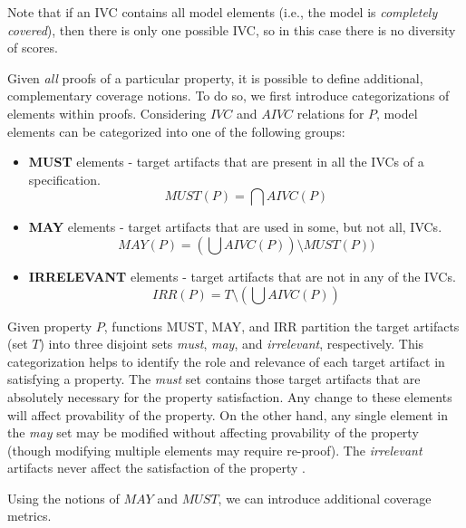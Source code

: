 \noindent Note that if an IVC contains all model elements (i.e., the model is {\em completely covered}), then there is only one possible IVC, so in this case there is no diversity of scores.


Given {\em all} proofs of a particular property, it is possible to define additional, complementary coverage notions.  To do so, we first introduce categorizations of elements within proofs.
%
Considering $IVC$ and $AIVC$ relations for $P$, model elements can be categorized into one of the following groups:

\begin{itemize}
  \item \textbf{MUST} elements - target artifacts that are present in all the IVCs of a specification.
      \[
      MUST (P) = \bigcap AIVC(P)
      \]

  \item \textbf{MAY} elements - target artifacts that are used in some, but not all, IVCs.
      \[
      MAY(P) = (\bigcup AIVC (P)) \setminus MUST (P))
      \]

  \item \textbf{IRRELEVANT} elements - target artifacts that are not in any of the IVCs.
  $$IRR(P) = T \setminus (\bigcup AIVC (P))$$
\end{itemize}

Given property $P$, functions MUST, MAY, and IRR partition the target artifacts (set $T$) into three disjoint sets \emph{must}, \emph{may}, and \emph{irrelevant}, respectively. This categorization helps to identify the role and relevance of each target artifact in satisfying a property. The \emph{must} set contains those target artifacts that are absolutely necessary for the property satisfaction.  Any change to these elements will affect provability of the property. On the other hand, any single element in the \emph{may} set may be modified without affecting provability of the property (though modifying multiple elements may require re-proof).   The \emph{irrelevant} artifacts never affect the satisfaction of the property \cite{Murugesan16:renext}.


Using the notions of $MAY$ and $MUST$, we can introduce additional coverage metrics.

